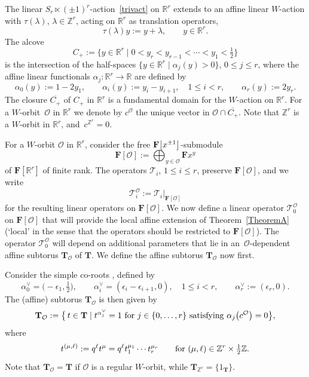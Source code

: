 \documentclass[pdftex]{sigma}
\numberwithin{equation}{section}
\begin{document}
{The linear $S_r\ltimes (\pm 1)^r$-action~\eqref{trivact} on $\mathbb{R}^r$ extends to an affine linear $W$-action with $\tau(\lambda)$,
$\lambda\in\mathbb{Z}^r$, acting on $\mathbb{R}^r$
as translation operators,
\[
\tau(\lambda)y:=y+\lambda,\qquad y\in\mathbb{R}^r.
\]
The alcove
\[
C_+:=\bigl\{y\in\mathbb{R}^r \mid 0<y_r<y_{r-1}<\cdots<y_1<\tfrac{1}{2}\bigr\}
\]
is the intersection of the half-spaces
$\{y\in\mathbb{R}^r\mid \alpha_j(y)>0\}$, $0\leq j\leq r$, where the affine linear functionals $\alpha_j\colon \mathbb{R}^r\rightarrow\mathbb{R}$ are defined by
\[
\alpha_0(y):=1-2y_1,\qquad \alpha_i(y):=y_i-y_{i+1},\quad 1\leq i<r,\qquad \alpha_r(y):=2y_r.
\]
The closure $\overline{C_+}$ of $C_+$ in $\mathbb{R}^r$ is a fundamental domain for the $W$-action on $\mathbb{R}^r$. For a $W$-orbit~$\mathcal{O}$ in $\mathbb{R}^r$ we denote by
$c^\mathcal{O}$ the unique vector in $\mathcal{O}\cap \overline{C_+}$. Note that $\mathbb{Z}^r$ is a $W$-orbit in $\mathbb{R}^r$, and~$c^{\mathbb{Z}^r}=0$.

For a $W$-orbit $\mathcal{O}$ in $\mathbb{R}^r$, consider the free $\mathbf{F}\smash{\bigl[x^{\pm 1}\bigr]}$-submodule
\[
\mathbf{F}[\mathcal{O}]:=\bigoplus_{y\in\mathcal{O}}\mathbf{F}x^y
\]
of $\mathbf{F}[\mathbb{R}^r]$ of finite rank. The operators $\mathcal{T}_i$, $1\leq i\leq r$, preserve $\mathbf{F}[\mathcal{O}]$, and we write
\[
\mathcal{T}_i^{\mathcal{O}}:=\mathcal{T}_i\vert_{\mathbf{F}[\mathcal{O}]}
\]
for the resulting linear operators on $\mathbf{F}[\mathcal{O}]$. We now define a linear operator $\mathcal{T}_0^\mathcal{O}$ on $\mathbf{F}[\mathcal{O}]$ that will provide the
local affine extension of Theorem~\ref{TheoremA} (`local' in the sense that the operators should be restricted to $\mathbf{F}[\mathcal{O}]$). The operator $\mathcal{T}_0^\mathcal{O}$ will depend on additional parameters that lie in an~$\mathcal{O}$-dependent affine subtorus $\mathbf{T}_\mathcal{O}$ of $\mathbf{T}$. We define the affine subtorus $\mathbf{T}_\mathcal{O}$ now first.

Consider the simple co-roots , defined by
\[
\alpha_0^\vee=\bigl(-\epsilon_1,\tfrac{1}{2}\bigr),\qquad \alpha_i^\vee=(\epsilon_i-\epsilon_{i+1},0),\quad 1\leq i<r,\qquad \alpha_r^\vee:=(\epsilon_r,0).
\]
The (affine) subtorus $\mathbf{T}_\mathcal{O}$ is then given by
\begin{equation}\label{F_torus_CCC}
\mathbf{T}_{\mathcal{O}}:=\bigl\{\,t\in\mathbf{T} \mid t^{\alpha_j^\vee}=1\ \text{for}\ j\in\{0,\dots,r\}\ \hbox{satisfying}\ \alpha_j\bigl(c^{\mathcal{O}}\bigr)=0\bigr\},
\end{equation}
where
\[
t^{(\mu,\ell)}:=q^\ell t^\mu=q^\ell t_1^{\mu_1}\cdots t_r^{\mu_r}\qquad \textup{for}\ (\mu,\ell)\in\mathbb{Z}^r\times\tfrac{1}{2}\mathbb{Z}.
\]
Note that $\mathbf{T}_\mathcal{O}=\mathbf{T}$
if $\mathcal{O}$ is a regular $W$-orbit, while $\mathbf{T}_{\mathbb{Z}^r}=\{1_{\mathbf{T}}\}$.

}
\end{document}
